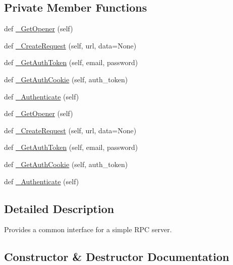 \subsection*{Private Member Functions}
\begin{DoxyCompactItemize}
\item 
def \mbox{\hyperlink{classupload_1_1_abstract_rpc_server_a388a9974eab1157ba4785e2ab2c33be9}{\+\_\+\+Get\+Opener}} (self)
\item 
def \mbox{\hyperlink{classupload_1_1_abstract_rpc_server_a1553c79619eec0770932cd4fa325243c}{\+\_\+\+Create\+Request}} (self, url, data=None)
\item 
def \mbox{\hyperlink{classupload_1_1_abstract_rpc_server_a5a801cc3fdbb8222fa58d41e098f70a7}{\+\_\+\+Get\+Auth\+Token}} (self, email, password)
\item 
def \mbox{\hyperlink{classupload_1_1_abstract_rpc_server_a45ba7a36fd840608f532694be6b6a9ae}{\+\_\+\+Get\+Auth\+Cookie}} (self, auth\+\_\+token)
\item 
def \mbox{\hyperlink{classupload_1_1_abstract_rpc_server_a8517a9d90ee2478752a53302f01d868d}{\+\_\+\+Authenticate}} (self)
\item 
def \mbox{\hyperlink{classupload_1_1_abstract_rpc_server_a388a9974eab1157ba4785e2ab2c33be9}{\+\_\+\+Get\+Opener}} (self)
\item 
def \mbox{\hyperlink{classupload_1_1_abstract_rpc_server_a1553c79619eec0770932cd4fa325243c}{\+\_\+\+Create\+Request}} (self, url, data=None)
\item 
def \mbox{\hyperlink{classupload_1_1_abstract_rpc_server_a5a801cc3fdbb8222fa58d41e098f70a7}{\+\_\+\+Get\+Auth\+Token}} (self, email, password)
\item 
def \mbox{\hyperlink{classupload_1_1_abstract_rpc_server_a45ba7a36fd840608f532694be6b6a9ae}{\+\_\+\+Get\+Auth\+Cookie}} (self, auth\+\_\+token)
\item 
def \mbox{\hyperlink{classupload_1_1_abstract_rpc_server_a8517a9d90ee2478752a53302f01d868d}{\+\_\+\+Authenticate}} (self)
\end{DoxyCompactItemize}


\subsection{Detailed Description}
\begin{DoxyVerb}Provides a common interface for a simple RPC server.\end{DoxyVerb}
 

\subsection{Constructor \& Destructor Documentation}
\mbox{\label{classupload_1_1_abstract_rpc_server_a3f6bc1bd16b52bd5a5c33a1fedeef2d0}} 
